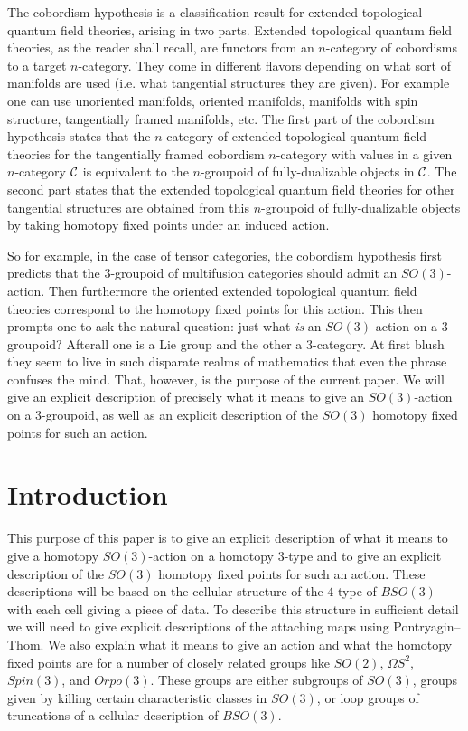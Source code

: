 \documentclass{amsart}
\begin{document}
The cobordism hypothesis is a classification result for extended topological quantum field theories, arising in two parts. Extended topological quantum field theories, as the reader shall recall, are functors from an $n$-category of cobordisms to a target $n$-category. They come in different flavors depending on what sort of manifolds are used (i.e. what tangential structures they are given). For example one can use unoriented manifolds, oriented manifolds, manifolds with spin structure, tangentially framed manifolds, etc. The first part of the cobordism hypothesis states that the $n$-category of extended topological quantum field theories for the tangentially framed cobordism $n$-category with values in a given $n$-category $\mathcal C$ is equivalent to the $n$-groupoid of fully-dualizable objects in $\mathcal C$. The second part states that the  extended topological quantum field theories for other tangential structures are obtained from this $n$-groupoid of fully-dualizable objects by taking homotopy fixed points under an induced action. 

So for example, in the case of tensor categories, the cobordism hypothesis first predicts that the 3-groupoid of multifusion categories should admit an $SO(3)$-action. Then furthermore the oriented extended topological quantum field theories correspond to the homotopy fixed points for this action. This then prompts one to ask the natural question: just what \emph{is} an $SO(3)$-action on a 3-groupoid? Afterall one is a Lie group and the other a 3-category. At first blush they seem to live in such disparate realms of mathematics that even the phrase confuses the mind.
That, however, is the purpose of the current paper. We will give an explicit description of precisely what it means to give an $SO(3)$-action on a 3-groupoid, as well as an explicit description of the $SO(3)$ homotopy fixed points for such an action.




 


\section{Introduction}

This purpose of this paper is to give an explicit description of what it means to give a homotopy $SO(3)$-action on a homotopy 3-type and to give an explicit description of the $SO(3)$ homotopy fixed points for such an action.  These descriptions will be based on the cellular structure of the $4$-type of $BSO(3)$ with each cell giving a piece of data.  To describe this structure in sufficient detail we will need to give explicit descriptions of the attaching maps using Pontryagin--Thom.  We also explain what it means to give an action and what the homotopy fixed points are for a number of closely related groups like $SO(2)$, $\Omega S^2$, $Spin(3)$, and $Orpo(3)$.  These groups are either subgroups of $SO(3)$, groups given by killing certain characteristic classes in $SO(3)$, or loop groups of truncations of a cellular description of $BSO(3)$.
\end{document}
